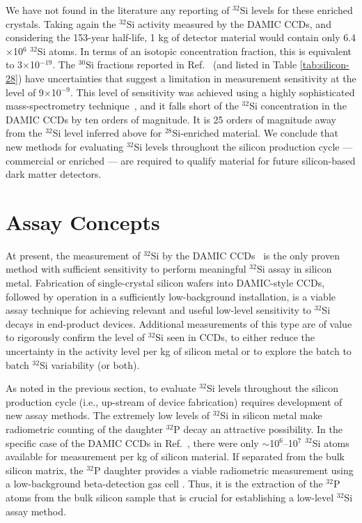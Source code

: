 \documentclass[final,5p]{elsarticle}
\def\si{$^{32}$Si\xspace}
\def\p{$^{32}$P\xspace}
\def\esi{$^{28}$Si\xspace}
\begin{document}
We have not found in the literature any reporting of \si levels for these enriched crystals. Taking again the \si activity measured by the DAMIC CCDs, and considering the 153-year half-life, 1 kg of detector material would contain only 6.4$\times$10$^{6}$ \si atoms. In terms of an isotopic concentration fraction, this is equivalent to 3$\times$10$^{-19}$. The $^{30}$Si fractions reported in Ref.\ \cite{fujii} (and listed in Table \ref{tab:silicon-28}) have uncertainties that suggest a limitation in measurement sensitivity at the level of 9$\times$10$^{-9}$. This level of sensitivity was achieved using a highly sophisticated mass-spectrometry technique~\cite{pramann2},
and it falls short of the \si concentration in the DAMIC CCDs by ten orders of magnitude. It is 25 orders of magnitude away from the \si level inferred above for \esi-enriched material. We conclude that new methods for evaluating \si  levels throughout the silicon production cycle --- commercial or enriched --- are required to qualify material for future silicon-based dark matter detectors.

\section{Assay Concepts}\label{sec:assay}
At present, the measurement of \si by the DAMIC CCDs~\cite{damic_backgrounds} is the only proven method with sufficient sensitivity to perform meaningful \si assay in silicon metal. Fabrication of single-crystal silicon wafers into DAMIC-style CCDs, followed by operation in a sufficiently low-background installation, is a viable assay technique for achieving relevant and useful low-level sensitivity to \si decays in end-product devices.  Additional measurements of this type are of value to rigorously confirm the level of \si seen in CCDs, to either reduce the uncertainty in the activity level per kg of silicon metal or to explore the batch to batch \si variability (or both). 

As noted in the previous section, to evaluate \si levels throughout the silicon production cycle (i.e., up-stream of device fabrication) requires development of new assay methods. The extremely low levels of \si in silicon metal make radiometric counting of the daughter \p decay an attractive possibility. In the specific case of the DAMIC CCDs in Ref.~\cite{damic_backgrounds}, there were only $\sim$10$^6$--10$^7$ \si atoms available for measurement per kg of silicon material. If separated from the bulk silicon matrix, the \p daughter provides a viable radiometric measurement using a low-background beta-detection gas cell \cite{bids1,bids2}.  Thus, it is the extraction of the \p atoms from the bulk silicon sample that is crucial for establishing a low-level \si assay method.
\end{document}
